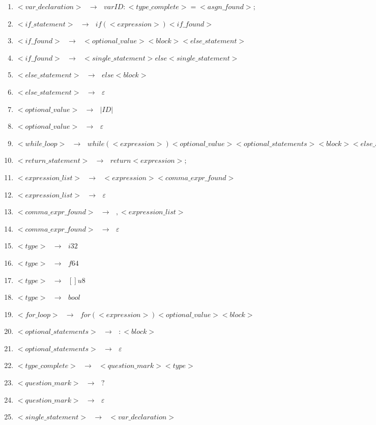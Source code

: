 \documentclass[12pt]{article}
\begin{document}
\begin{enumerate}
\item $<var\_declaration> \text{ }\to \text{ } var ID : <type\_complete> = <asgn\_found> ;$
\item $<if\_statement> \text{ }\to \text{ } if ( <expression> ) <if\_found>$
\item $<if\_found> \text{ }\to \text{ } <optional\_value> <block> <else\_statement>$
\item $<if\_found> \text{ }\to \text{ } <single\_statement> else <single\_statement>$
\item $<else\_statement> \text{ }\to \text{ } else <block>$
\item $<else\_statement> \text{ }\to \text{ } \varepsilon$
\item $<optional\_value> \text{ }\to \text{ } | ID |$
\item $<optional\_value> \text{ }\to \text{ } \varepsilon$
\item $<while\_loop> \text{ }\to \text{ } while ( <expression> ) <optional\_value> <optional\_statements> <block> <else\_statement>$
\item $<return\_statement> \text{ }\to \text{ } return <expression> ;$
\item $<expression\_list> \text{ }\to \text{ } <expression> <comma\_expr\_found>$
\item $<expression\_list> \text{ }\to \text{ } \varepsilon$
\item $<comma\_expr\_found> \text{ }\to \text{ } , <expression\_list>$ 
\item $<comma\_expr\_found> \text{ }\to \text{ } \varepsilon$
\item $<type> \text{ }\to \text{ } i32$
\item $<type> \text{ }\to \text{ } f64$
\item $<type> \text{ }\to \text{ } [] u8$
\item $<type> \text{ }\to \text{ } bool$
\item $<for\_loop> \text{ }\to \text{ } for ( <expression> ) <optional\_value> <block>$
\item $<optional\_statements> \text{ }\to \text{ } : <block>$ 
\item $<optional\_statements> \text{ }\to \text{ } \varepsilon$
\item $<type\_complete> \text{ }\to \text{ } <question\_mark> <type>$
\item $<question\_mark> \text{ }\to \text{ } ?$
\item $<question\_mark> \text{ }\to \text{ } \varepsilon$
\item $ <single\_statement> \text{ }\to \text{ } <var\_declaration>$

\end{enumerate}
\end{document}
